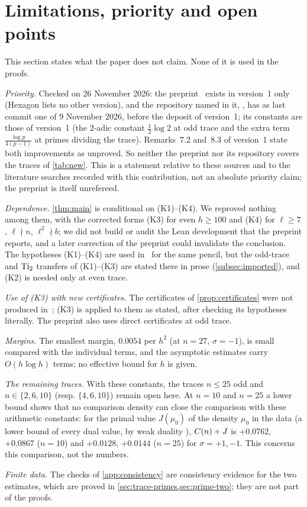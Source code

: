 \section{Limitations, priority and open points}\label{sec:limitations}

\sloppy
This section states what the paper does not claim. None of it is used in the proofs.

\emph{Priority.} Checked on 26 November 2026: the preprint~\Kri{} exists in version~1 only (Hexagon lists no
other version), and the repository named in it, , has
as last commit one of 9 November 2026, before the deposit of version~1; its constants are those of version~1 (the
$2$-adic constant $\frac12\log2$ at odd trace and the extra term $\frac{\log p}{4(p-1)}$ at primes dividing the trace).
Remarks~7.2 and~8.3 of version~1 state both improvements as unproved. So neither the preprint nor its repository covers the
traces of \cref{tab:new}. This is a statement relative to these sources and to the literature searches
recorded with this contribution, not an absolute priority claim; the preprint is itself unrefereed.

\emph{Dependence.} \cref{thm:main} is conditional on (K1)--(K4). We reproved nothing among them, with the
corrected forms (K3) for even $h\ge100$ and (K4) for $\ell\ge7$, $\ell\nmid n$, $\ell^2\nmid b$; we did not
build or audit the Lean development that the preprint reports, and a later correction of the preprint could
invalidate the conclusion. The hypotheses (K1)--(K4) are used in~\Kri{} for the same pencil, but the odd-trace and
$\operatorname{Ti}_2$ transfers of (K1)--(K3) are stated there in prose (\cref{subsec:imported}), and (K2) is needed only at even trace.

\emph{Use of (K3) with new certificates.} The certificates of \cref{prop:certificates} were not produced in~\Kri;
(K3) is applied to them as stated, after checking its hypotheses literally. The preprint also uses direct
certificates at odd trace.

\emph{Margins.} The smallest margin, $0.0054$ per $h^2$ (at $n=27$, $\sigma=-1$), is small compared with the
individual terms, and the asymptotic estimates carry $O(h\log h)$ terms; no effective bound for $h$ is given.

\emph{The remaining traces.} With these constants, the traces $n\le25$ odd and $n\in\{2,6,10\}$ (resp.
$\{4,6,10\}$) remain open here. At $n=10$ and $n=25$ a lower bound shows that no comparison density can close the
comparison with these arithmetic constants: for the primal value $J(\mu_0)$ of the density $\mu_0$
in the data (a lower bound of every dual value, by weak duality \cite[(5.2)]{Krisman2026units}), $C(n)+J$ is
$+0.0762$, $+0.0867$ ($n=10$) and $+0.0128$, $+0.0144$ ($n=25$) for $\sigma=+1,-1$. This concerns this comparison,
not the numbers.

\emph{Finite data.} The checks of \cref{app:consistency} are consistency evidence for the two estimates, which are
proved in \cref{sec:trace-primes,sec:prime-two}; they are not part of the proofs.
